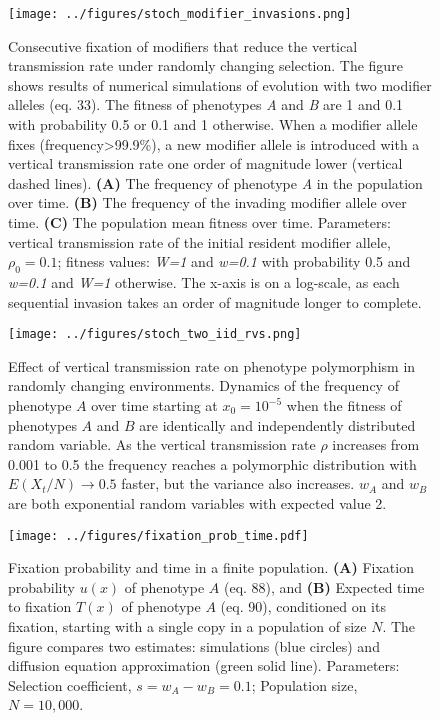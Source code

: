 \documentclass[]{article}
\begin{document}
\begin{figure}
\centering
\texttt{[image: ../figures/stoch\_modifier\_invasions.png]}
\caption{Consecutive fixation of modifiers that reduce the vertical
transmission rate under randomly changing selection. The figure shows
results of numerical simulations of evolution with two modifier alleles
(eq. 33). The
fitness of phenotypes \emph{A} and \emph{B} are 1 and 0.1 with probability 0.5 or 0.1 and 1 otherwise.
When a modifier allele fixes
(frequency\textgreater{}99.9\%), a new modifier allele is introduced
with a vertical transmission rate one order of magnitude lower (vertical
dashed lines). \textbf{(A)} The frequency of phenotype \emph{A} in the
population over time. \textbf{(B)} The frequency of the invading
modifier allele over time. \textbf{(C)} The population mean fitness over time. Parameters: vertical transmission rate of the initial
resident modifier allele, \(\rho_0 =0.1\); fitness values: \emph{W=1}
and \emph{w=0.1} with probability 0.5 and \emph{w=0.1} and \emph{W=1}
otherwise. The x-axis is on a log-scale, as each sequential invasion takes
an order of magnitude longer to
complete.}\label{fig:stoch_modifier_invasions}
\end{figure}

\begin{figure}
\centering
\texttt{[image: ../figures/stoch\_two\_iid\_rvs.png]}
\caption{Effect of vertical transmission rate on phenotype polymorphism
in randomly changing environments. Dynamics of the frequency of phenotype
\(A\) over time starting
at \(x_0=10^{-5}\) when the fitness of phenotypes \(A\) and \(B\) are
identically and independently distributed random variable. As the vertical transmission rate \(\rho\) increases
from 0.001 to 0.5 the frequency reaches a polymorphic distribution with \(E(X_t/N)\to0.5\) faster, but
the variance also increases. \(w_A\) and \(w_B\) are both exponential
random variables with expected value 2.}\label{fig:stoch_two_iid_rvs}
\end{figure}

\begin{figure}
\centering
\texttt{[image: ../figures/fixation\_prob\_time.pdf]}
\caption{Fixation probability and time in a finite population.
\textbf{(A)} Fixation probability \(u(x)\) of phenotype \(A\) (eq. 88), and \textbf{(B)}
Expected time to fixation \(T(x)\) of phenotype \(A\) (eq. 90), conditioned on its
fixation, starting with a single copy in a population of size \(N\). The
figure compares two estimates: simulations (blue circles) and diffusion
equation approximation (green solid line). Parameters: Selection coefficient, \(s=w_A-w_B=0.1\);
Population size, \(N=10,000\).}\label{fixation_prob_time}
\end{figure}
\end{document}
